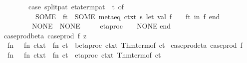 \begin{isabellebody}
\ \ \ \ \ \ \ \ {\isacharparenleft}{\kern0pt}case\ split{\isacharunderscore}{\kern0pt}pat\ eta{\isacharunderscore}{\kern0pt}term{\isacharunderscore}{\kern0pt}pat\ {}\ t\ of\isanewline
\ \ \ \ \ \ \ \ \ \ SOME\ {\isacharparenleft}{\kern0pt}{\isacharunderscore}{\kern0pt}{\isacharcomma}{\kern0pt}\ ft{\isacharparenright}{\kern0pt}\ {\isacharequal}{\kern0pt}{\isachargreater}{\kern0pt}\ SOME\ {\isacharparenleft}{\kern0pt}metaeq\ ctxt\ s\ {\isacharparenleft}{\kern0pt}let\ val\ f\ {\isachardollar}{\kern0pt}\ {\isacharunderscore}{\kern0pt}\ {\isacharequal}{\kern0pt}\ ft\ in\ f\ end{\isacharparenright}{\kern0pt}{\isacharparenright}{\kern0pt}\isanewline
\ \ \ \ \ \ \ \ {\isacharbar}{\kern0pt}\ NONE\ {\isacharequal}{\kern0pt}{\isachargreater}{\kern0pt}\ NONE{\isacharparenright}{\kern0pt}\isanewline
\ \ \ \ {\isacharbar}{\kern0pt}\ eta{\isacharunderscore}{\kern0pt}proc\ {\isacharunderscore}{\kern0pt}\ {\isacharunderscore}{\kern0pt}\ {\isacharequal}{\kern0pt}\ NONE{\isacharsemicolon}{\kern0pt}\isanewline
end{\isacharsemicolon}{\kern0pt}\isanewline
{\isacartoucheclose}\isanewline
{}\isamarkupfalse%
\ case{\isacharunderscore}{\kern0pt}prod{\isacharunderscore}{\kern0pt}beta\ {\isacharparenleft}{\kern0pt}{\isachardoublequoteopen}case{\isacharunderscore}{\kern0pt}prod\ f\ z{\isachardoublequoteclose}{\isacharparenright}{\kern0pt}\ {\isacharequal}{\kern0pt}\isanewline
\ \ {\isacartoucheopen}fn\ {\isacharunderscore}{\kern0pt}\ {\isacharequal}{\kern0pt}{\isachargreater}{\kern0pt}\ fn\ ctxt\ {\isacharequal}{\kern0pt}{\isachargreater}{\kern0pt}\ fn\ ct\ {\isacharequal}{\kern0pt}{\isachargreater}{\kern0pt}\ beta{\isacharunderscore}{\kern0pt}proc\ ctxt\ {\isacharparenleft}{\kern0pt}Thm{\isachardot}{\kern0pt}term{\isacharunderscore}{\kern0pt}of\ ct{\isacharparenright}{\kern0pt}{\isacartoucheclose}\isanewline
{}\isamarkupfalse%
\ case{\isacharunderscore}{\kern0pt}prod{\isacharunderscore}{\kern0pt}eta\ {\isacharparenleft}{\kern0pt}{\isachardoublequoteopen}case{\isacharunderscore}{\kern0pt}prod\ f{\isachardoublequoteclose}{\isacharparenright}{\kern0pt}\ {\isacharequal}{\kern0pt}\isanewline
\ \ {\isacartoucheopen}fn\ {\isacharunderscore}{\kern0pt}\ {\isacharequal}{\kern0pt}{\isachargreater}{\kern0pt}\ fn\ ctxt\ {\isacharequal}{\kern0pt}{\isachargreater}{\kern0pt}\ fn\ ct\ {\isacharequal}{\kern0pt}{\isachargreater}{\kern0pt}\ eta{\isacharunderscore}{\kern0pt}proc\ ctxt\ {\isacharparenleft}{\kern0pt}Thm{\isachardot}{\kern0pt}term{\isacharunderscore}{\kern0pt}of\ ct{\isacharparenright}{\kern0pt}{\isacartoucheclose}%

\end{isabellebody}
